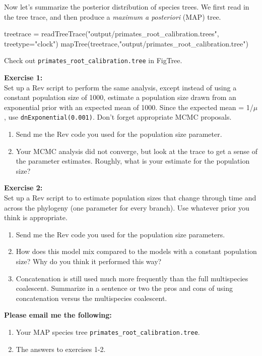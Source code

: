 \documentclass[11pt]{article}
\begin{document}
Now let's summarize the posterior distribution of species trees.
We first read in the tree trace, and then produce a \textit{maximum a posteriori} (MAP) tree.
\begin{code}
treetrace = readTreeTrace("output/primates_root_calibration.trees", treetype="clock")
mapTree(treetrace,"output/primates_root_calibration.tree")
\end{code}
Check out \texttt{primates\_root\_calibration.tree} in FigTree.

\begin{framed}
\noindent
\textbf{Exercise 1:} \\
Set up a Rev script to perform the same
analysis, except instead of using a constant
population size of 1000, estimate a population size
drawn from an exponential prior with an expected mean of 1000. 
Since the expected mean = 1/$\mu$, use \texttt{dnExponential(0.001)}.
Don't forget appropriate MCMC proposals.
\begin{enumerate}
\item Send me the Rev code you used for the population size parameter.
\item Your MCMC analysis did not converge, but look at the trace
        to get a sense of the parameter estimates. Roughly, what is
            your estimate for the population size? %
\end{enumerate}
\end{framed}

\begin{framed}
\noindent
\textbf{Exercise 2:} \\
Set up a Rev script to to estimate
population sizes that change through time 
and across the phylogeny (one parameter for every branch).
Use whatever prior you think is appropriate.
\begin{enumerate}
\item Send me the Rev code you used for the population size parameters.
\item How does this model mix compared to the models with a constant population size? Why do you think it performed this way?
\item Concatenation is still used much more frequently than the full multispecies coalescent.
        Summarize in a sentence or two the pros and cons of using concatenation versus the multispecies coalescent.
\end{enumerate}
\end{framed}

\begin{framed}
\noindent
\textbf{Please email me the following:}
\begin{enumerate}
  \item Your MAP species tree \texttt{primates\_root\_calibration.tree}.
  \item The answers to exercises 1-2.
\end{enumerate}
\end{framed}


 
\end{document}
